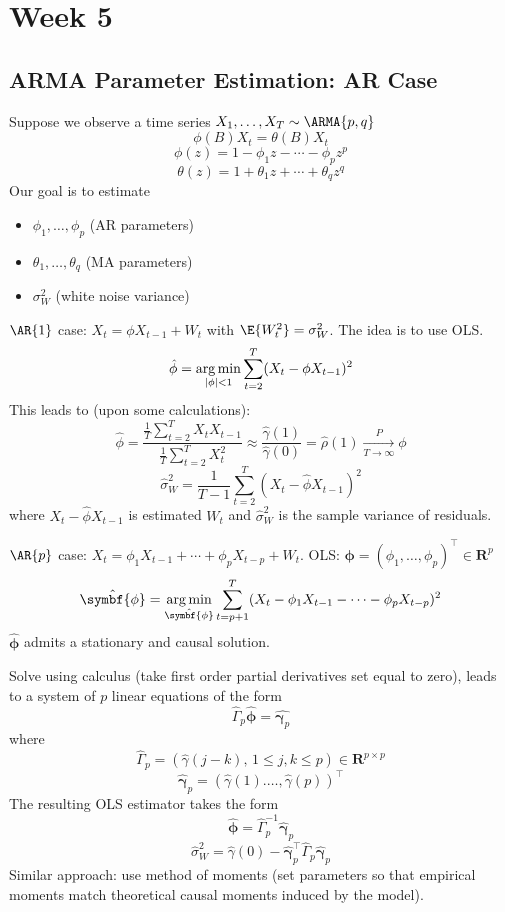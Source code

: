 \chapter{Week 5}
\section{ARMA Parameter Estimation: AR Case}
Suppose we observe a time series
$ X_1,\ldots,X_T \sim \ARMA{p,q} $
\[ \phi(B)X_t=\theta(B)X_t \]
\[ \phi(z)=1-\phi_1 z-\cdots - \phi_p z^p \]
\[ \theta(z)=1+\theta_1 z+\cdots+\theta_q z^q \]
Our goal is to estimate
\begin{itemize}
    \item $ \phi_1,\ldots,\phi_p $ (AR parameters)
    \item $ \theta_1,\ldots,\theta_q $ (MA parameters)
    \item $ \sigma_W^2 $ (white noise variance)
\end{itemize}
$ \AR{1} $ case: $ X_t=\phi X_{t-1}+W_t $ with $ \E{W_t^2}=\sigma_W^2 $.
The idea is to use OLS\@.
\[ \hat{\phi}=\operatorname*{arg\,min}_{\lvert\phi\rvert<1}\sum_{t=2}^{T} (X_t-\phi X_{t-1})^2 \]
This leads to (upon some calculations):
\[ \hat{\phi}=\frac{\frac{1}{T}  \sum_{t=2}^{T} X_t X_{t-1}}{\frac{1}{T} \sum_{t=2}^{T} X_t^2}
    \approx \frac{\hat{\gamma}(1)}{\hat{\gamma}(0)}=\hat{\rho}(1)
    \xrightarrow[T\to\infty]{P}\phi   \]
\[ \hat{\sigma}_W^2=\frac{1}{T-1} \sum_{t=2}^{T} (X_t-\hat{\phi}X_{t-1})^2 \]
where $ X_t-\hat{\phi}X_{t-1} $ is estimated $ W_t $ and $ \hat{\sigma}_W^2 $
is the sample variance of residuals.

$ \AR{p} $ case: $ X_t=\phi_1 X_{t-1}+\cdots+\phi_p X_{t-p}+W_t $.
OLS\@: $ \symbf{\phi}=(\phi_1,\ldots,\phi_p)^\top \in\mathbf{R}^p $
\[ \hat{\symbf{\phi}}=\argmin_{\hat{\symbf{\phi}}}\sum_{t=p+1}^{T} (X_t-\phi_1X_{t-1}-\cdots-\phi_p X_{t-p})^2 \]
$\hat{\symbf{\phi}}$ admits a stationary and causal solution.

Solve using calculus (take first order partial derivatives set equal to zero),
leads to a system of $ p $ linear equations of the form
\[ \hat{\Gamma}_p \symbf{\hat{\phi}}=\hat{\symbf{\gamma}_p} \]
where
\[ \hat{\Gamma}_p=(\hat{\gamma}(j-k),\, 1\le j,k\le p)\in\mathbf{R}^{p\times p} \]
\[ \symbf{\hat{\gamma}}_p=(\hat{\gamma}(1).\ldots,\hat{\gamma}(p))^\top \]
The resulting OLS estimator takes the form
\[ \hat{\symbf{\phi}}=\hat{\Gamma}_p^{-1}\hat{\symbf{\gamma}}_p \]
\[ \hat{\sigma}_W^2=\hat{\gamma}(0)-\hat{\symbf{\gamma}}_p^\top \hat{\Gamma}_p \hat{\symbf{\gamma}}_p \]
Similar approach: use method of moments (set parameters so that
empirical moments match theoretical causal moments induced by the model).

